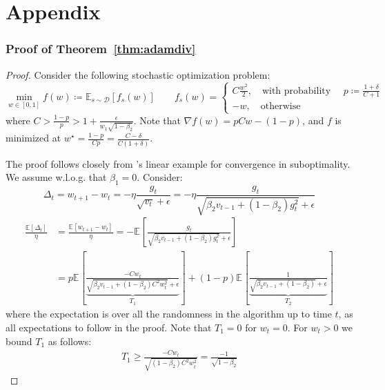 \documentclass{article}
\newcommand{\thmref}[1]{Theorem~\ref{#1}}
\newcommand{\currw}{w_t}
\newcommand{\nextw}{w_{t+1}}
\newcommand{\w}{w}
\newcommand{\fs}{f_s}
\newcommand{\currg}{g_t}
\newcommand{\prevv}{v_{t-1}}
\newcommand{\currv}{v_t}
\newcommand{\btwo}{\beta_2}
\newcommand{\bone}{\beta_1}
\newcommand{\expec}[2]{\mathbb E_{#1} \left[ {#2} \right]}
\newcommand{\dist}{\mathcal D}
\begin{document}
\onecolumn
\newpage
\part*{Appendix}
\appendix

\section{Proof of \thmref{thm:adamdiv}}
\label{sec:proof1}

\begin{proof}
Consider the following stochastic optimization problem:
\begin{equation}
   \min_{\w \in [0,1]} f(\w) \coloneqq \expec{s \sim \dist}{\fs(\w)} \qquad
   \fs(\w) =
   \begin{cases}
      C \frac{\w^2}2,
         \quad \text{with probability }
         \quad p \coloneqq \frac{1+\delta}{C+1} \\
      -\w, \quad \text{otherwise}
   \end{cases}
\end{equation}
where $C > \frac{1-p}p > 1 + \frac{\epsilon}{\w_1 \sqrt{1 - \btwo}}$.  Note
that $\nabla f(\w) = p C \w - (1-p)$, and $f$ is minimized at
$\w^\star = \frac{1-p}{Cp} = \frac{C-\delta}{C(1+\delta)}$.

The proof follows closely from \citet{amsgrad}'s linear example for convergence in
suboptimality.  We assume w.l.o.g. that $\bone = 0$.  Consider:
\begin{equation}
   \Delta_t
      = \nextw - \currw
      = - \eta \frac{\currg}{\sqrt{\currv} + \epsilon}
      = - \eta \frac{\currg}{\sqrt{\btwo \prevv + (1-\btwo) \currg^2} +
                             \epsilon}
\end{equation}
\begin{equation}
\begin{split}
   \frac{\expec{}{\Delta_t}}{\eta}
     &= \frac{\expec{}{\nextw - \currw} }{\eta}
      = - \expec{}{\frac{g_t}{\sqrt{\btwo \prevv + (1-\btwo) g_t^2} + \epsilon}} \\
     &=   p  \expec{}{ \underbrace{\frac{- C \currw}{\sqrt{\btwo \prevv + (1-\btwo) C^2 \currw^2} + \epsilon}}_{T_1}} +
       (1-p) \expec{}{ \underbrace{\frac{1}{\sqrt{\btwo \prevv + (1-\btwo)} + \epsilon}}_{T_2}}
\end{split}
\label{eq:onlinebound}
\end{equation}
where the expectation is over all the randomness in the algorithm up to time
$t$, as all expectations to follow in the proof.  Note that $T_1 = 0$ for
$\currw = 0$. For $\currw > 0$ we bound $T_1$ as follows:
\begin{equation}
\begin{split}
   T_1 \geq \frac{- C \currw}{\sqrt{(1-\btwo) C^2 \currw^2}}
          = \frac{- 1 }{\sqrt{1-\btwo}}
\end{split}
\end{equation}


\end{proof}
\end{document}
